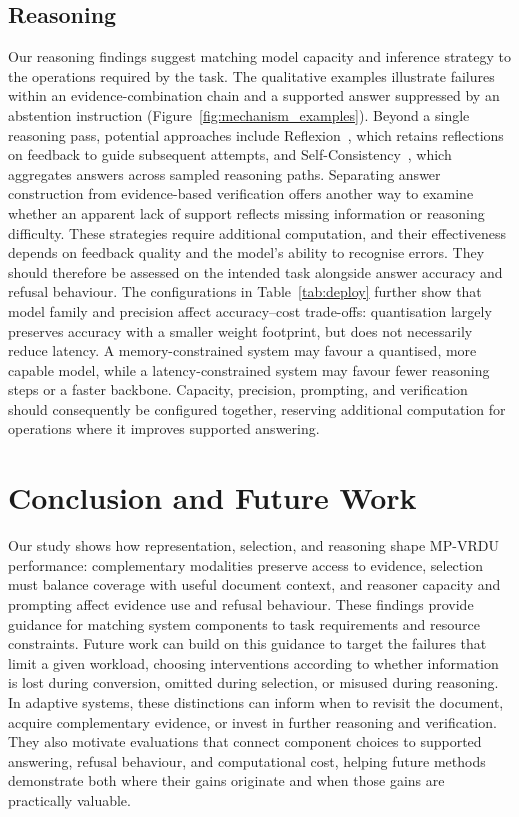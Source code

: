 \documentclass[11pt]{article}
\begin{document}
\subsection{Reasoning}
\label{sec:implications_reasoning}

Our reasoning findings suggest matching model capacity and inference strategy to the operations required by the task. The qualitative examples illustrate failures within an evidence-combination chain and a supported answer suppressed by an abstention instruction (Figure~\ref{fig:mechanism_examples}). Beyond a single reasoning pass, potential approaches include Reflexion~\citep{shinn2023reflexion}, which retains reflections on feedback to guide subsequent attempts, and Self-Consistency~\citep{wang2023self}, which aggregates answers across sampled reasoning paths. Separating answer construction from evidence-based verification offers another way to examine whether an apparent lack of support reflects missing information or reasoning difficulty. These strategies require additional computation, and their effectiveness depends on feedback quality and the model's ability to recognise errors. They should therefore be assessed on the intended task alongside answer accuracy and refusal behaviour. The configurations in Table~\ref{tab:deploy} further show that model family and precision affect accuracy--cost trade-offs: quantisation largely preserves accuracy with a smaller weight footprint, but does not necessarily reduce latency. A memory-constrained system may favour a quantised, more capable model, while a latency-constrained system may favour fewer reasoning steps or a faster backbone. Capacity, precision, prompting, and verification should consequently be configured together, reserving additional computation for operations where it improves supported answering.

\section{Conclusion and Future Work}
\label{sec:conclusion}

Our study shows how representation, selection, and reasoning shape MP-VRDU performance: complementary modalities preserve access to evidence, selection must balance coverage with useful document context, and reasoner capacity and prompting affect evidence use and refusal behaviour. These findings provide guidance for matching system components to task requirements and resource constraints. Future work can build on this guidance to target the failures that limit a given workload, choosing interventions according to whether information is lost during conversion, omitted during selection, or misused during reasoning. In adaptive systems, these distinctions can inform when to revisit the document, acquire complementary evidence, or invest in further reasoning and verification. They also motivate evaluations that connect component choices to supported answering, refusal behaviour, and computational cost, helping future methods demonstrate both where their gains originate and when those gains are practically valuable.
\end{document}

